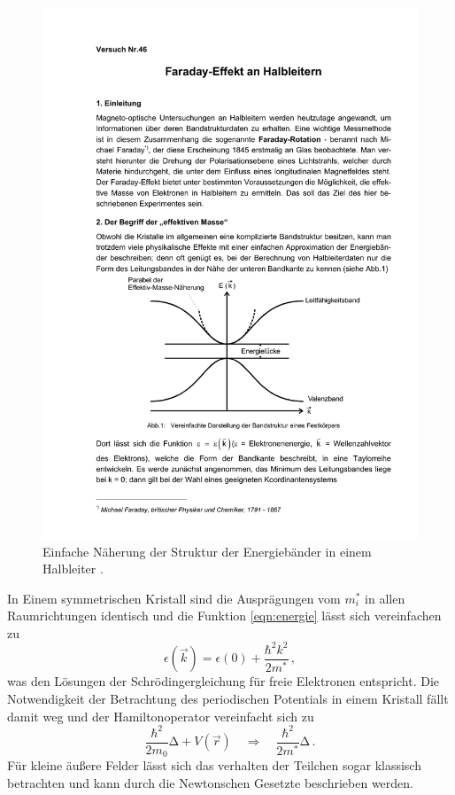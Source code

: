 \begin{figure}[h]
    \centering
    \includegraphics[width=0.8\linewidth]{img/band.pdf}
    \caption{
        Einfache Näherung der Struktur der Energiebänder in einem Halbleiter
        \cite{V46}.
    }
    \label{fig:band}
\end{figure}
In Einem symmetrischen Kristall sind die Ausprägungen vom $m_i^*$ in allen
Raumrichtungen identisch und die Funktion \eqref{eqn:energie} lässt sich
vereinfachen zu
\begin{equation}
    \label{eqn:energie_einfach}
    \epsilon\left(\vec{k}\right) = \epsilon(0) + \frac{\hbar^2k^2}{2m^*}\,,
\end{equation}
was den Lösungen der Schrödingergleichung für freie Elektronen entspricht.
Die Notwendigkeit der Betrachtung des periodischen Potentials in einem Kristall
fällt damit weg und der Hamiltonoperator vereinfacht sich zu
\begin{equation*}
    \frac{\hbar^2}{2m_0}\mathrm{\Delta} + V(\vec{r})
    \quad\Rightarrow\quad
    \frac{\hbar^2}{2m^*}\mathrm{\Delta}\,.
\end{equation*}
Für kleine äußere Felder lässt sich das verhalten der Teilchen sogar
klassisch betrachten und kann durch die Newtonschen Gesetzte beschrieben
werden.

